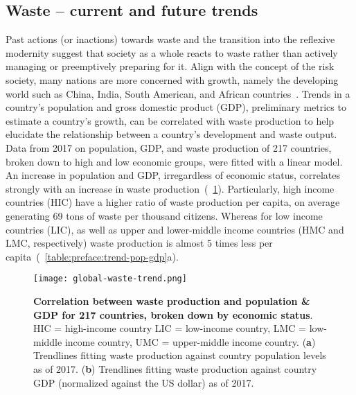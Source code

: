 \documentclass[../main/main]{subfiles}
\begin{document}
\subsection{Waste -- current and future trends}
\label{section:preface:current-and-future-trends}
Past actions (or inactions) towards waste and the transition into the reflexive modernity suggest that society as a whole reacts to waste rather than actively managing or preemptively preparing for it. Align with the concept of the risk society, many nations are more concerned with growth, namely the developing world such as China, India, South American, and African countries~\cite{cohen2006urbanization}. Trends in a country's population and gross domestic product (GDP), preliminary metrics to estimate a country's growth, can be correlated with waste production to help elucidate the relationship between a country's development and waste output. Data from 2017 on population, GDP, and waste production of 217 countries, broken down to high and low economic groups, were fitted with a linear model. An increase in population and GDP, irregardless of economic status, correlates strongly with an increase in waste production~(\FIGURE~\ref{figure:preface:global-waste-trend}). Particularly, high income countries (HIC) have a higher ratio of waste production per capita, on average generating 69 tons of waste per thousand citizens.
Whereas for low income countries (LIC), as well as upper and lower-middle income countries (HMC and LMC, respectively) waste production is almost 5 times less per capita~(\TABLE~\ref{table:preface:trend-pop-gdp}a).

\begin{figure}[H]
	\centering
	\texttt{[image: global-waste-trend.png]}
	\caption[Correlation between waste production and population \& GDP for 217 countries, broken down by economic status]
	{
		\textbf{Correlation between waste production and population \& GDP for 217 countries, broken down by economic status}\protect\footnotemark.
		HIC = high-income country
		LIC = low-income country,
		LMC = low-middle income country,
		UMC = upper-middle income country.
		(\textbf{a}) Trendlines fitting waste production against country population levels as of 2017.
		(\textbf{b}) Trendlines fitting waste production against country GDP (normalized against the US dollar) as of 2017.
	}
	\label{figure:preface:global-waste-trend}
\end{figure}
\end{document}
